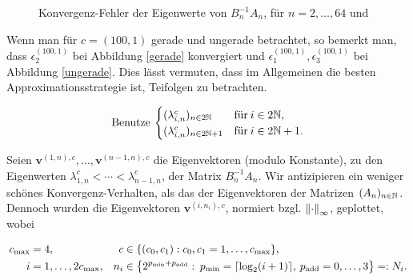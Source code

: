 \begin{figure}[H]
{}
\hspace{0mm}
\caption{Konvergenz-Fehler der Eigenwerte von $B_n^{-1} A_n$, für $n = 2, \ldots, 64$ und}
\label{fig:Konvergenz-Fehler_EW_allgemein_besser}
\end{figure}

Wenn man für $c = (100, 1)$ gerade und ungerade betrachtet, so bemerkt man, dass $\epsilon_2^{(100, 1)}$ bei Abbildung \ref{gerade} konvergiert und $\epsilon_1^{(100, 1)}, \epsilon_3^{(100, 1)}$ bei Abbildung \ref{ungerade}. Dies lässt vermuten, dass im Allgemeinen die besten Approximationsstrategie ist, Teifolgen zu betrachten.

\begin{align*}
  \text{Benutze} \:
  \begin{cases}
    (\lambda_{i, n}^c)_{n \in 2 \N}     & \text{für} \: i \in 2 \N, \\
    (\lambda_{i, n}^c)_{n \in 2 \N + 1} & \text{für} \: i \in 2 \N + 1.
  \end{cases}
\end{align*}

Seien $\mathbf{v}^{(1, n), c}, \ldots, \mathbf{v}^{(n-1, n), c}$ die Eigenvektoren (modulo Konstante), zu den Eigenwerten $\lambda_{1, n}^c < \cdots < \lambda_{n-1, n}^c$, der Matrix $B_n^{-1} A_n$. Wir antizipieren ein weniger schönes Konvergenz-Verhalten, als das der Eigenvektoren der Matrizen $(A_n)_{n \in \N}$. Dennoch wurden die Eigenvektoren $\mathbf{v}^{(i, n_i), c}$, normiert bzgl. $\norm[\infty]{\cdot}$, geplottet, wobei

\begin{align*}
  c_{\mathrm{max}} & = 4, &
  c & \in \Bbraces{(c_0, c_1): c_0, c_1 = 1, \ldots, c_{\mathrm{max}}}, \\
  i & = 1, \ldots, 2 c_{\mathrm{max}}, &
  n_i & \in \Bbraces
  {
    2^{p_{\text{min}} + p_{\text{add}}}: \:
    p_{\text{min}} = \ceil{\log_2(i+1)}, \:
    p_{\text{add}} = 0, \ldots, 3
  } =: N_i.
\end{align*}

